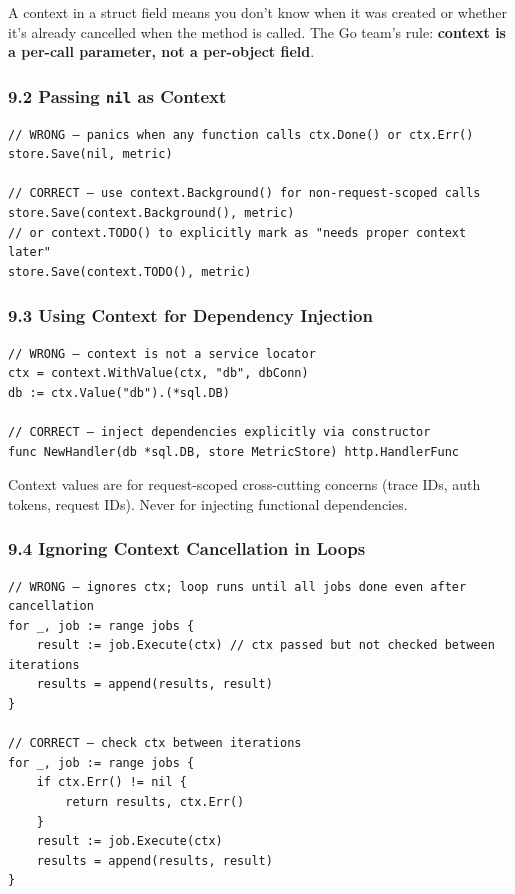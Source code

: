 \documentclass[11pt,a4paper,oneside]{book}
\begin{document}
A context in a struct field means you don't know when it was created or
whether it's already cancelled when the method is called. The Go team's
rule: \textbf{context is a per-call parameter, not a per-object field}.

\subsubsection{\texorpdfstring{9.2 Passing \texttt{nil} as
Context}{9.2 Passing nil as Context}}

\begin{verbatim}
// WRONG — panics when any function calls ctx.Done() or ctx.Err()
store.Save(nil, metric)

// CORRECT — use context.Background() for non-request-scoped calls
store.Save(context.Background(), metric)
// or context.TODO() to explicitly mark as "needs proper context later"
store.Save(context.TODO(), metric)
\end{verbatim}

\subsubsection{9.3 Using Context for Dependency
Injection}

\begin{verbatim}
// WRONG — context is not a service locator
ctx = context.WithValue(ctx, "db", dbConn)
db := ctx.Value("db").(*sql.DB)

// CORRECT — inject dependencies explicitly via constructor
func NewHandler(db *sql.DB, store MetricStore) http.HandlerFunc
\end{verbatim}

Context values are for request-scoped cross-cutting concerns (trace IDs,
auth tokens, request IDs). Never for injecting functional dependencies.

\subsubsection{9.4 Ignoring Context Cancellation in
Loops}

\begin{verbatim}
// WRONG — ignores ctx; loop runs until all jobs done even after cancellation
for _, job := range jobs {
    result := job.Execute(ctx) // ctx passed but not checked between iterations
    results = append(results, result)
}

// CORRECT — check ctx between iterations
for _, job := range jobs {
    if ctx.Err() != nil {
        return results, ctx.Err()
    }
    result := job.Execute(ctx)
    results = append(results, result)
}
\end{verbatim}
\end{document}
